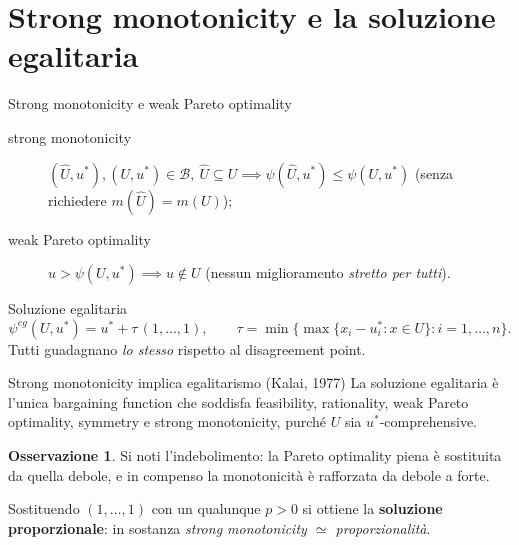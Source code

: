 \documentclass[12pt,a4paper,twoside]{book}
\theoremstyle{plain}
\theoremstyle{definition}
\newtheorem{remark}[theorem]{Osservazione}
\begin{document}
\section{Strong monotonicity e la soluzione egalitaria}

\begin{defbox}{Strong monotonicity e weak Pareto optimality}
\begin{description}
  \item[strong monotonicity] $(\widehat U,u^*),(U,u^*)\in\mathcal{B},\ \widehat U\subseteq U
        \implies\psi(\widehat U,u^*)\le\psi(U,u^*)$ (senza richiedere $m(\widehat U)=m(U)$);
  \item[weak Pareto optimality] $u>\psi(U,u^*)\implies u\notin U$ (nessun miglioramento
        \emph{stretto per tutti}).
\end{description}
\end{defbox}

\begin{defbox}{Soluzione egalitaria}
\[
  \psi^{eg}(U,u^*)=u^*+\tau\,(1,\dots,1),\qquad
  \tau=\min\bigl\{\max\{x_i-u^*_i : x\in U\} : i=1,\dots,n\bigr\}.
\]
Tutti guadagnano \emph{lo stesso} rispetto al disagreement point.
\end{defbox}

\begin{thmbox}{Strong monotonicity implica egalitarismo (Kalai, 1977)}
La soluzione egalitaria è l'unica bargaining function che soddisfa feasibility, rationality,
weak Pareto optimality, symmetry e strong monotonicity, purché $U$ sia $u^*$-comprehensive.
\end{thmbox}

\begin{remark}
Si noti l'indebolimento: la Pareto optimality piena è sostituita da quella debole, e in
compenso la monotonicità è rafforzata da debole a forte.

Sostituendo $(1,\dots,1)$ con un qualunque $p>0$ si ottiene la \textbf{soluzione
proporzionale}: in sostanza \emph{strong monotonicity $\simeq$ proporzionalità}.
\end{remark}
\end{document}
